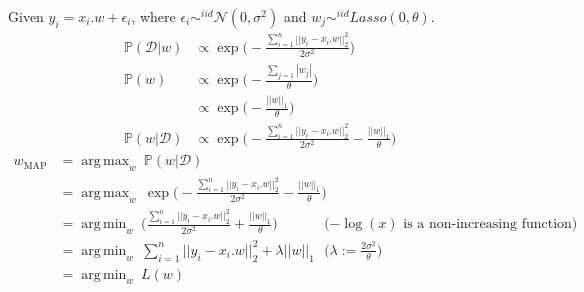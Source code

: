 \documentclass[12pt, fleqn]{article}
\DeclareMathOperator*{\argmax}{arg\,max}
\DeclareMathOperator*{\argmin}{arg\,min}
\begin{document}
\subsubsection{}
Given $y_i = x_i . w + \epsilon_i$, where $\epsilon_i \sim^{iid} \mathcal{N}(0, \sigma^2)$ and $w_j \sim^{iid} Lasso(0, \theta)$.
\begin{equation*}
  \begin{aligned}
    \mathbb{P}(\mathcal{D} | w) & \propto \exp \bigg( -\frac{\sum_{i=1}^n || y_i - x_i . w ||_2^2}{2 \sigma^2} \bigg)                         \\
    \mathbb{P}(w)               & \propto \exp \bigg( -\frac{\sum_{j=1} |w_j|}{\theta} \bigg)                                                 \\
                                & \propto \exp \bigg( -\frac{||w||_1}{\theta} \bigg)                                                          \\
    \mathbb{P}(w | \mathcal{D}) & \propto \exp \bigg( -\frac{\sum_{i=1}^n || y_i - x_i . w ||_2^2}{2 \sigma^2} -\frac{||w||_1}{\theta} \bigg)
  \end{aligned}
\end{equation*}
\begin{equation*}
  \begin{aligned}
    w_{\text{MAP}} & = \argmax_w \ \mathbb{P}(w | \mathcal{D})                                                                                                                              \\
                   & = \argmax_w \ \exp \bigg( -\frac{\sum_{i=1}^n || y_i - x_i . w ||_2^2}{2 \sigma^2} -\frac{||w||_1}{\theta} \bigg)                                                      \\
                   & = \argmin_w \ \bigg( \frac{\sum_{i=1}^n || y_i - x_i . w ||_2^2}{2 \sigma^2} + \frac{||w||_1}{\theta} \bigg)      & \text{($-\log(x)$ is a non-increasing function)}   \\
                   & = \argmin_w \ \sum_{i=1}^n || y_i - x_i . w ||_2^2 + \lambda ||w||_1                                              & \bigg( \lambda := \frac{2 \sigma^2}{\theta} \bigg) \\
                   & = \argmin_w \ L(w)
  \end{aligned}
\end{equation*}
\end{document}

